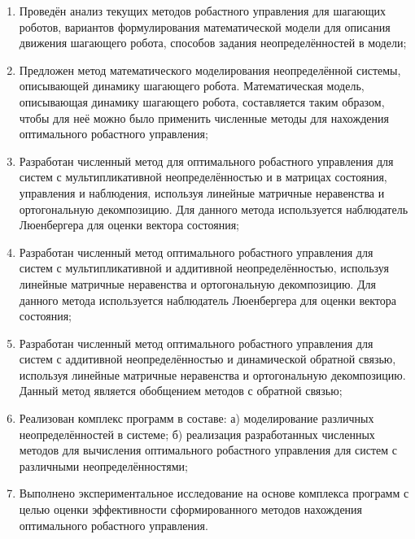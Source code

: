\begin{enumerate}
  \item Проведён анализ текущих методов робастного управления для шагающих роботов, вариантов формулирования математической модели для описания движения шагающего робота, способов задания неопределённостей в модели;
  \item Предложен метод математического моделирования неопределённой системы, описывающей динамику шагающего робота. Математическая модель, описывающая динамику шагающего робота, составляется таким образом, чтобы для неё можно было применить численные методы для нахождения оптимального робастного управления;
  \item Разработан численный метод для оптимального робастного управления для систем с мультипликативной неопределённостью и в матрицах состояния, управления и наблюдения, используя линейные матричные неравенства и ортогональную декомпозицию. Для данного метода используется наблюдатель Люенбергера для оценки вектора состояния;
  \item Разработан численный метод оптимального робастного управления для систем с мультипликативной и аддитивной неопределённостью, используя линейные матричные неравенства и ортогональную декомпозицию. Для данного метода используется наблюдатель Люенбергера для оценки вектора состояния;
  \item Разработан численный метод оптимального робастного управления для систем с аддитивной неопределённостью и динамической обратной связью, используя линейные матричные неравенства и ортогональную декомпозицию. Данный метод является обобщением методов с обратной связью;
  \item Реализован комплекс программ в составе: а) моделирование различных неопределённостей в системе; б) реализация разработанных численных методов для вычисления оптимального робастного управления для систем с различными неопределённостями;
  \item Выполнено экспериментальное исследование на основе комплекса программ с целью оценки эффективности сформированного методов нахождения оптимального робастного управления.
\end{enumerate}
